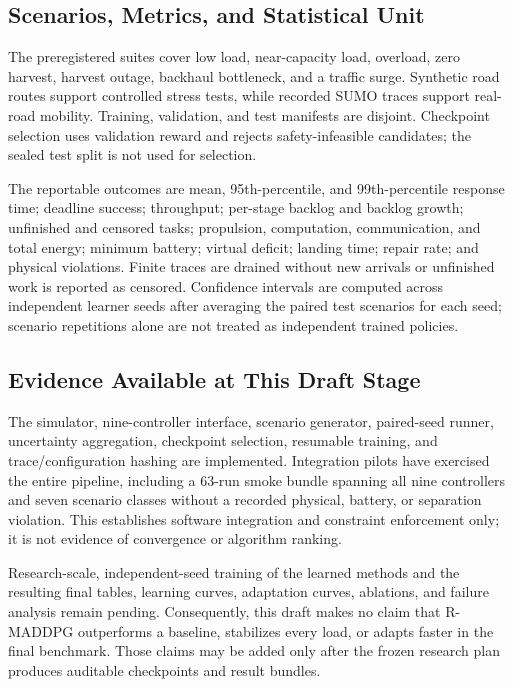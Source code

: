\documentclass[journal]{IEEEtran}
\begin{document}
\subsection{Scenarios, Metrics, and Statistical Unit}
The preregistered suites cover low load, near-capacity load, overload,
zero harvest, harvest outage, backhaul bottleneck, and a traffic surge.
Synthetic road routes support controlled stress tests, while recorded SUMO
traces support real-road mobility.  Training, validation, and test manifests
are disjoint.  Checkpoint selection uses validation reward and rejects
safety-infeasible candidates; the sealed test split is not used for selection.

The reportable outcomes are mean, 95th-percentile, and 99th-percentile
response time; deadline success; throughput; per-stage backlog and backlog
growth; unfinished and censored tasks; propulsion, computation,
communication, and total energy; minimum battery; virtual deficit; landing
time; repair rate; and physical violations.  Finite traces are drained without
new arrivals or unfinished work is reported as censored.  Confidence
intervals are computed across independent learner seeds after averaging the
paired test scenarios for each seed; scenario repetitions alone are not
treated as independent trained policies.

\subsection{Evidence Available at This Draft Stage}
The simulator, nine-controller interface, scenario generator, paired-seed
runner, uncertainty aggregation, checkpoint selection, resumable training,
and trace/configuration hashing are implemented.  Integration pilots have
exercised the entire pipeline, including a 63-run smoke bundle spanning all
nine controllers and seven scenario classes without a recorded physical,
battery, or separation violation.  This establishes software integration and
constraint enforcement only; it is not evidence of convergence or algorithm
ranking.

Research-scale, independent-seed training of the learned methods and the
resulting final tables, learning curves, adaptation curves, ablations, and
failure analysis remain pending.  Consequently, this draft makes no claim
that R-MADDPG outperforms a baseline, stabilizes every load, or adapts faster
in the final benchmark.  Those claims may be added only after the frozen
research plan produces auditable checkpoints and result bundles.
\end{document}
